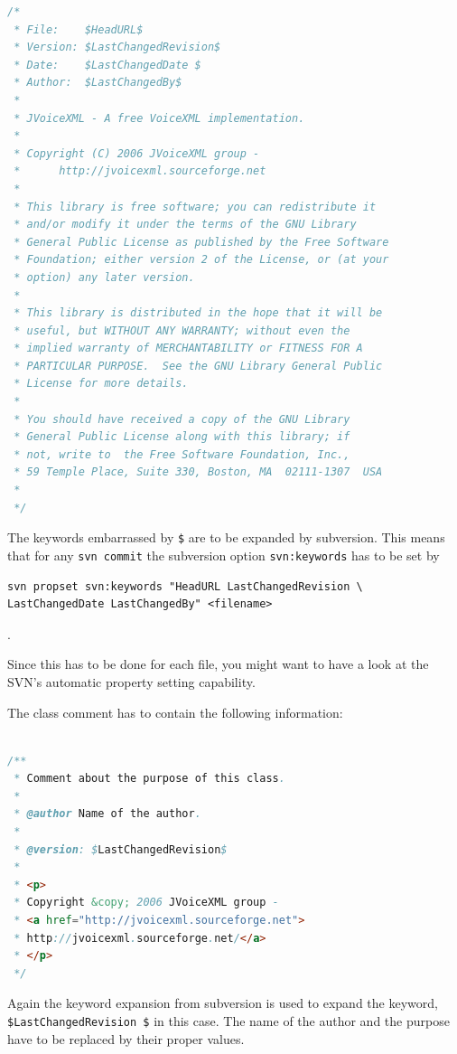 \documentclass[11pt,a4paper]{article}
\begin{document}
\begin{lstlisting}[language=Java]
/*
 * File:    $HeadURL$
 * Version: $LastChangedRevision$
 * Date:    $LastChangedDate $
 * Author:  $LastChangedBy$
 *
 * JVoiceXML - A free VoiceXML implementation.
 *
 * Copyright (C) 2006 JVoiceXML group - 
 *      http://jvoicexml.sourceforge.net
 *
 * This library is free software; you can redistribute it 
 * and/or modify it under the terms of the GNU Library 
 * General Public License as published by the Free Software 
 * Foundation; either version 2 of the License, or (at your 
 * option) any later version.
 *
 * This library is distributed in the hope that it will be 
 * useful, but WITHOUT ANY WARRANTY; without even the 
 * implied warranty of MERCHANTABILITY or FITNESS FOR A 
 * PARTICULAR PURPOSE.  See the GNU Library General Public 
 * License for more details.
 *
 * You should have received a copy of the GNU Library 
 * General Public License along with this library; if 
 * not, write to  the Free Software Foundation, Inc., 
 * 59 Temple Place, Suite 330, Boston, MA  02111-1307  USA
 *
 */
\end{lstlisting}

The keywords embarrassed by \texttt{\$} are to be expanded by 
subversion. 
This means that for any \texttt{svn commit} the subversion
option \texttt{svn:keywords} has to be set by

\begin{lstlisting}
svn propset svn:keywords "HeadURL LastChangedRevision \
LastChangedDate LastChangedBy" <filename>
\end{lstlisting}.

Since this has to be done for each file, you might want to have a look
at the SVN's automatic property setting capability.

The class comment has to contain the following information:

\begin{lstlisting}[language=Java]

/**
 * Comment about the purpose of this class.
 *
 * @author Name of the author.
 *
 * @version: $LastChangedRevision$
 *
 * <p>
 * Copyright &copy; 2006 JVoiceXML group -
 * <a href="http://jvoicexml.sourceforge.net">
 * http://jvoicexml.sourceforge.net/</a>
 * </p>
 */
\end{lstlisting}

Again the keyword expansion from subversion is used to expand the keyword,
\texttt{\$LastChangedRevision \$} in this case. The name of the author and the 
purpose have to be replaced by their proper values.
\end{document}
